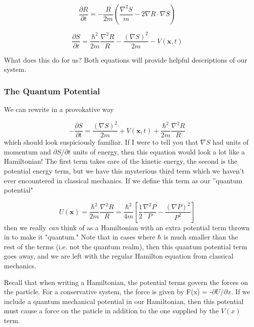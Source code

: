 \begin{equation}
\label{dR/dt}
\frac{\partial R}{\partial t} = -\frac{R}{2 m}\left(\frac{\nabla^2 S}{m}-2\nabla R \cdot \nabla S\right)
\end{equation}


\begin{equation}
\label{dS/dt}
\frac{\partial S}{\partial t} = \frac{\hbar^2}{2m}\frac{\nabla^2 R}{R} - \frac{(\nabla S)^2}{2 m} - V(\mathbf{x},t)
\end{equation}

What does this do for us? Both equations will provide helpful descriptions of our system.

\subsubsection{The Quantum Potential}

We can rewrite  in a provokative way 

\begin{equation}
\label{BohmHamiltonian}
- \frac{\partial S}{\partial t} = \frac{(\nabla S)^2}{2 m} + V(\mathbf{x},t) + \frac{\hbar^2}{2m}\frac{\nabla^2 R}{R}
\end{equation}
which should look suspiciously familiar. If I were to tell you that $\nabla S$ had units of momentum and $\partial S/\partial t$ units of energy, then this equation would look a lot like a Hamiltonian! The first term takes care of the kinetic energy, the second is the potential energy term, but we have this mysterious third term which we haven't ever encountered in classical mechanics. If we define this term as our ''quantum potential" 

\begin{equation}
\label{QuantumPotential}
U(\mathbf{x}) =  \frac{\hbar^2}{2m}\frac{\nabla^2 R}{R} = \frac{\hbar^2}{4m}\left[\frac{1}{2} \frac{\nabla^2 P}{P} - \frac{(\nabla P)^2}{P^2}\right] 
\end{equation}
then we really \textit{can} think of  as a Hamiltonian with an extra potential term thrown in to make it "quantum." Note that in cases where $\hbar$ is much smaller than the rest of the terms (i.e. not the quantum realm), then this quantum potential term goes away, and we are left with the regular Hamilton equation from classical mechanics. 

Recall that when writing a Hamiltonian, the potential terms govern the forces on the particle. For a conservative system, the force is given by F(x) = -$\partial U/\partial x$. If we include a quantum mechanical potential in our Hamiltonian, then this potential must cause a force on the paticle in addition to the one supplied by the $V(x)$ term. 


